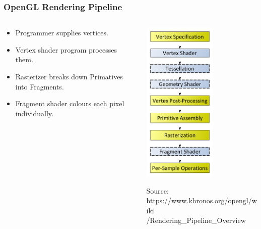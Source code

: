 \documentclass{beamer}
\begin{document}
\begin{frame}
\frametitle{OpenGL Rendering Pipeline}
\begin{columns}
    \begin{column}{0.5\textwidth}
      \begin{itemize}
        \item Programmer supplies vertices.
        \item Vertex shader program processes them.
        \item Rasterizer breaks down Primatives into Fragments.
        \item Fragment shader colours each pixel individually.
      \end{itemize}
    \end{column}
    \begin{column}{0.5\textwidth}
      \centering
      \includegraphics[width=0.6\textwidth]{RenderingPipeline.png}
      \par \tiny {Source: https://www.khronos.org/opengl/wiki\\/Rendering\_Pipeline\_Overview}
    \end{column}
  \end{columns}
\end{frame}
\end{document}
